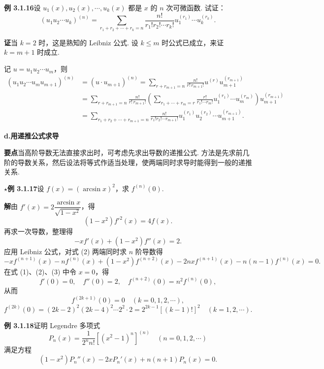 \documentclass[UTF8, 12pt, fontset=fandol, oneside]{ctexart}
\begin{document}
\noindent\textbf{例 3.1.16}\quad 设 $u_1(x),u_2(x),\cdots,u_k(x)$ 都是 $x$ 的 $n$ 次可微函数. 试证：
\[
  (u_1u_2\cdots u_k)^{(n)}
  =\sum_{r_1+r_2+\cdots+r_k=n}
  \frac{n!}{r_1!r_2!\cdots r_k!}u_1^{(r_1)}\cdots u_k^{(r_k)}.
\]

\noindent\textbf{证}\quad 当 $k=2$ 时，这是熟知的 Leibniz 公式. 设 $k\le m$ 时公式已成立，来证 $k=m+1$ 时成立.

记 $u=u_1u_2\cdots u_m$，则
\[
\begin{aligned}
(u_1u_2\cdots u_m u_{m+1})^{(n)}
&=(u\cdot u_{m+1})^{(n)}
=\sum_{r+r_{m+1}=n}\frac{n!}{r!\,r_{m+1}!}u^{(r)}u_{m+1}^{(r_{m+1})}\\
&=\sum_{r+r_{m+1}=n}\frac{n!}{r!\,r_{m+1}!}
\left(\sum_{r_1+\cdots+r_m=r}
\frac{r!}{r_1!\cdots r_m!}u_1^{(r_1)}\cdots u_m^{(r_m)}\right)
u_{m+1}^{(r_{m+1})}\\
&=\sum_{r_1+r_2+\cdots+r_{m+1}=n}
\frac{n!}{r_1!r_2!\cdots r_{m+1}!}
u_1^{(r_1)}u_2^{(r_2)}\cdots u_{m+1}^{(r_{m+1})}.
\end{aligned}
\]

\noindent\textbf{d.\quad 用递推公式求导}

\noindent\textbf{要点}\quad 当高阶导数无法直接求出时，可考虑先求出导数的递推公式. 方法是先求前几阶的导数关系，然后设法将等式作适当处理，使两端同时求导时能得到一般的递推关系.

\noindent\textbf{$\star$例 3.1.17}\quad 设 $f(x)=(\arcsin x)^2$，求 $f^{(n)}(0)$.

\noindent\textbf{解}\quad 由 $f'(x)=2\dfrac{\arcsin x}{\sqrt{1-x^2}}$，得
\begin{equation}
  (1-x^2)f'^2(x)=4f(x).
\tag{1}
\end{equation}
再求一次导数，整理得
\begin{equation}
  -xf'(x)+(1-x^2)f''(x)=2.
\tag{2}
\end{equation}
应用 Leibniz 公式，对式 (2) 两端同时求 $n$ 阶导数得
\begin{equation}
  -xf^{(n+1)}(x)-nf^{(n)}(x)+(1-x^2)f^{(n+2)}(x)
  -2nxf^{(n+1)}(x)-n(n-1)f^{(n)}(x)=0.
\tag{3}
\end{equation}
在式 (1)、(2)、(3) 中令 $x=0$，得
\[
  f'(0)=0,\quad f''(0)=2,\quad f^{(n+2)}(0)=n^2f^{(n)}(0),
\]
从而
\[
  f^{(2k+1)}(0)=0\quad(k=0,1,2,\cdots),
\]
\[
  f^{(2k)}(0)=(2k-2)^2(2k-4)^2\cdots2^2\cdot2
  =2^{2k-1}[(k-1)!]^2\quad(k=1,2,\cdots).
\]

\noindent\textbf{例 3.1.18}\quad 证明 Legendre 多项式
\[
  P_n(x)=\frac1{2^n n!}\left[(x^2-1)^n\right]^{(n)}\quad(n=0,1,2,\cdots)
\]
满足方程
\[
  (1-x^2)P_n''(x)-2xP_n'(x)+n(n+1)P_n(x)=0.
\]
\end{document}

